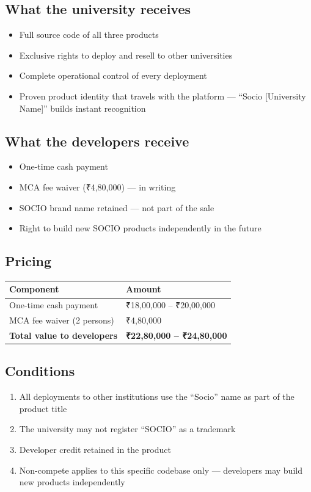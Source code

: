 \documentclass[12pt,a4paper]{article}
\begin{document}
\vspace{0.4cm}

\subsection*{What the university receives}
\begin{itemize}[leftmargin=*, noitemsep]
    \item Full source code of all three products
    \item Exclusive rights to deploy and resell to other universities
    \item Complete operational control of every deployment
    \item Proven product identity that travels with the platform — ``Socio [University Name]'' builds instant recognition
\end{itemize}

\subsection*{What the developers receive}
\begin{itemize}[leftmargin=*, noitemsep]
    \item One-time cash payment
    \item MCA fee waiver (₹4,80,000) — in writing
    \item SOCIO brand name retained — not part of the sale
    \item Right to build new SOCIO products independently in the future
\end{itemize}

\subsection*{Pricing}

\begin{tabularx}{\textwidth}{L{5cm} X}
\toprule
{}
\textbf{Component} & \textbf{Amount} \\
\midrule
One-time cash payment & ₹18,00,000 – ₹20,00,000 \\
MCA fee waiver (2 persons) & ₹4,80,000 \\
\textbf{Total value to developers} & \textbf{₹22,80,000 – ₹24,80,000} \\
\bottomrule
\end{tabularx}

\subsection*{Conditions}
\begin{enumerate}[leftmargin=*, noitemsep]
    \item All deployments to other institutions use the ``Socio'' name as part of the product title
    \item The university may not register ``SOCIO'' as a trademark
    \item Developer credit retained in the product
    \item Non-compete applies to this specific codebase only — developers may build new products independently
\end{enumerate}
\end{document}
